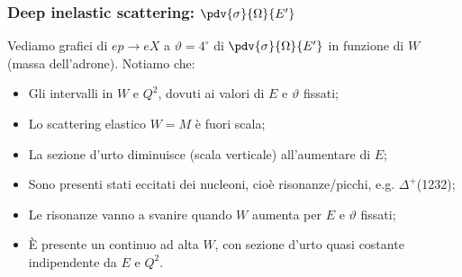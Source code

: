 \subsubsection{Deep inelastic scattering: $\pdv{\sigma}{\Omega}{E'}$}
\begin{minipage}[t]{0.48\textwidth}
Vediamo grafici di $ep\to eX$ a $\vartheta=4^\circ$ di $\pdv{\sigma}{\Omega}{E'}$ in funzione di $W$ (massa dell'adrone). Notiamo che:
\begin{itemize}
    \item Gli intervalli in $W$ e $Q^2$, dovuti ai valori di $E$ e $\vartheta$ fissati;
    \item Lo scattering elastico $W=M$ è fuori scala;
    \item La sezione d'urto diminuisce (scala verticale) all'aumentare di $E$;
    \item Sono presenti stati eccitati dei nucleoni, cioè risonanze/picchi, e.g. $\Delta^+$(1232);
    \item Le risonanze vanno a svanire quando $W$ aumenta per $E$ e $\vartheta$ fissati;
    \item È presente un continuo ad alta $W$, con sezione d'urto quasi costante indipendente da $E$ e $Q^2$.
\end{itemize}
\end{minipage}
\hfill
